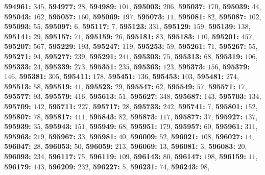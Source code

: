 \textsf{\bfseries 594961:} $345$, \textsf{\bfseries 594977:} $28$, \textsf{\bfseries 594989:} $101$, \textsf{\bfseries 595003:} $206$, \textsf{\bfseries 595037:} $170$, \textsf{\bfseries 595039:} $44$, \textsf{\bfseries 595043:} $162$, \textsf{\bfseries 595057:} $160$, \textsf{\bfseries 595069:} $197$, \textsf{\bfseries 595073:} $11$, \textsf{\bfseries 595081:} $82$, \textsf{\bfseries 595087:} $102$, \textsf{\bfseries 595093:} $55$, \textsf{\bfseries 595097:} $6$, \textsf{\bfseries 595117:} $7$, \textsf{\bfseries 595123:} $331$, \textsf{\bfseries 595129:} $159$, \textsf{\bfseries 595139:} $138$, \textsf{\bfseries 595141:} $29$, \textsf{\bfseries 595157:} $71$, \textsf{\bfseries 595159:} $26$, \textsf{\bfseries 595181:} $83$, \textsf{\bfseries 595183:} $110$, \textsf{\bfseries 595201:} $457$, \textsf{\bfseries 595207:} $567$, \textsf{\bfseries 595229:} $193$, \textsf{\bfseries 595247:} $119$, \textsf{\bfseries 595253:} $59$, \textsf{\bfseries 595261:} $71$, \textsf{\bfseries 595267:} $55$, \textsf{\bfseries 595271:} $94$, \textsf{\bfseries 595277:} $239$, \textsf{\bfseries 595291:} $241$, \textsf{\bfseries 595303:} $75$, \textsf{\bfseries 595313:} $68$, \textsf{\bfseries 595319:} $106$, \textsf{\bfseries 595333:} $24$, \textsf{\bfseries 595339:} $273$, \textsf{\bfseries 595351:} $235$, \textsf{\bfseries 595363:} $123$, \textsf{\bfseries 595373:} $156$, \textsf{\bfseries 595379:} $146$, \textsf{\bfseries 595381:} $305$, \textsf{\bfseries 595411:} $178$, \textsf{\bfseries 595451:} $136$, \textsf{\bfseries 595453:} $103$, \textsf{\bfseries 595481:} $274$, \textsf{\bfseries 595513:} $58$, \textsf{\bfseries 595519:} $41$, \textsf{\bfseries 595523:} $29$, \textsf{\bfseries 595547:} $62$, \textsf{\bfseries 595549:} $57$, \textsf{\bfseries 595571:} $17$, \textsf{\bfseries 595577:} $93$, \textsf{\bfseries 595579:} $416$, \textsf{\bfseries 595613:} $51$, \textsf{\bfseries 595627:} $348$, \textsf{\bfseries 595687:} $143$, \textsf{\bfseries 595703:} $134$, \textsf{\bfseries 595709:} $142$, \textsf{\bfseries 595711:} $227$, \textsf{\bfseries 595717:} $28$, \textsf{\bfseries 595733:} $242$, \textsf{\bfseries 595741:} $7$, \textsf{\bfseries 595801:} $152$, \textsf{\bfseries 595807:} $78$, \textsf{\bfseries 595817:} $411$, \textsf{\bfseries 595843:} $82$, \textsf{\bfseries 595873:} $117$, \textsf{\bfseries 595877:} $37$, \textsf{\bfseries 595927:} $137$, \textsf{\bfseries 595939:} $35$, \textsf{\bfseries 595943:} $151$, \textsf{\bfseries 595949:} $68$, \textsf{\bfseries 595951:} $179$, \textsf{\bfseries 595957:} $60$, \textsf{\bfseries 595961:} $311$, \textsf{\bfseries 595963:} $219$, \textsf{\bfseries 595967:} $33$, \textsf{\bfseries 595981:} $40$, \textsf{\bfseries 596009:} $52$, \textsf{\bfseries 596021:} $108$, \textsf{\bfseries 596027:} $14$, \textsf{\bfseries 596047:} $28$, \textsf{\bfseries 596053:} $50$, \textsf{\bfseries 596059:} $213$, \textsf{\bfseries 596069:} $13$, \textsf{\bfseries 596081:} $3$, \textsf{\bfseries 596083:} $20$, \textsf{\bfseries 596093:} $234$, \textsf{\bfseries 596117:} $75$, \textsf{\bfseries 596119:} $109$, \textsf{\bfseries 596143:} $80$, \textsf{\bfseries 596147:} $198$, \textsf{\bfseries 596159:} $11$, \textsf{\bfseries 596179:} $143$, \textsf{\bfseries 596209:} $232$, \textsf{\bfseries 596227:} $5$, \textsf{\bfseries 596231:} $74$, \textsf{\bfseries 596243:} $98$, 
